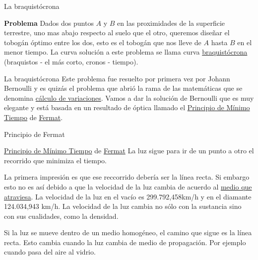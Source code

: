 \documentclass[handout,hyperref={colorlinks=true}]{beamer}
\newcommand{\nl}{\onslide<+-> }
\begin{document}
\begin{frame}{La braquistócrona}
 
\textbf{Problema} Dados dos puntos $A$ y $B$ en las proximidades de la superficie terrestre, uno mas abajo respecto al suelo que el otro,
queremos diseñar el tobogán óptimo entre los dos, 
esto es el tobogán que nos lleve de $A$ hasta $B$ en el menor tiempo. La curva solución a este problema se llama curva 
\href{http://es.wikipedia.org/wiki/Curva_braquistócrona}{braquistócrona} (braquistos - el más corto, cronos - tiempo). 
 
\begin{center}
\end{center}
\end{frame}

\begin{frame}{La braquistócrona}
\nl Este problema fue resuelto por primera vez por Johann Bernoulli y es quizás el problema  que abrió la rama de las matemáticas que se denomina 
\href{http://es.wikipedia.org/wiki/Cálculo_variacional}{cálculo de 
variaciones}. Vamos a dar la solución de Bernoulli que es muy elegante y está basada en un resultado de óptica llamado 
 el \href{http://es.wikipedia.org/wiki/Principio_de_Fermat}{Principio de Mínimo Tiempo} de \href{http://es.wikipedia.org/wiki/Fermat}{Fermat}.




\end{frame}


\begin{frame}{Principio de Fermat}

\nl\begin{block}{\href{http://es.wikipedia.org/wiki/Principio_de_Fermat}{Principio de Mínimo Tiempo} de \href{http://es.wikipedia.org/wiki/Fermat}{Fermat}}
 La luz sigue para ir de un punto a otro el recorrido que minimiza el tiempo.
\end{block}

\nl La primera impresión   es que ese reccorrido debería ser la línea recta. Si embargo esto no es así debido a que la velocidad de la luz cambia
de acuerdo al \href{http://es.wikipedia.org/wiki/Velocidad_de_la_luz_en_un_medio_material}{medio que atraviesa}. 
La velocidad de la luz en el vacío es 299.792,458km/h y en el diamante 124.034,943 km/h. La velocidad de la luz cambia no sólo con la sustancia sino con sus cualidades, 
como la densidad. 

\nl Si la luz se mueve dentro de un medio homogéneo, el camino que sigue es la línea recta. Esto cambia cuando la luz cambia de medio de propagación. Por ejemplo
cuando pasa del aire al vidrio. 

\end{frame}
\end{document}
